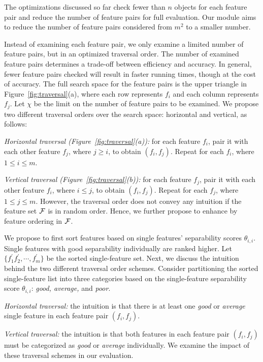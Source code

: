 The optimizations discussed so far check fewer
than $n$ objects for each feature pair and reduce
the number of feature pairs
for full evaluation. Our \traversal module
aims to reduce the number of feature pairs
considered from $m^2$ to a smaller number.

 Instead of examining each feature pair, we only examine a limited number of feature pairs, but in an optimized traversal order. The number of examined feature pairs determines a trade-off between efficiency and accuracy. In general, fewer feature pairs checked will result in faster running times, though at the cost of accuracy.
The full search space for the feature pairs is the upper triangle in Figure~\ref{fig:traversal}(a), where each row represents $f_i$ and each column represents $f_j$. Let $\chi$ be the limit on the number of feature pairs to be examined. We propose two different traversal orders over the search space: horizontal and vertical, as follows:
\squishlist
\item \emph{Horizontal traversal (Figure~\ref{fig:traversal}(a)):} for each feature $f_i$, pair it with each other feature $f_j$, where $j\geq i$, to obtain $(f_i,f_j)$. Repeat for each $f_i$, where $1 \leq i\leq m$.
\item \emph{Vertical traversal (Figure~\ref{fig:traversal}(b)):} for each feature $f_j$, pair it with each other feature $f_i$, where $i\leq j$, to obtain $(f_i,f_j)$. Repeat for each $f_j$, where $1 \leq j\leq m$.
\squishend
\noindent
However, the traversal order does not convey any intuition if the feature set ${\mathcal{F}}$ is in random order. Hence, we further propose to enhance \traversal by feature ordering in ${\mathcal{F}}$.

 We propose to first sort features based on single features' separability scores $\theta_{i,i}$. Single features with good separability individually are ranked higher. Let $\{f_1^{'} f_2^{'},\cdots,f_m^{'}\}$ be the sorted single-feature set. Next, we discuss the intuition behind the two different traversal order schemes. Consider partitioning the sorted single-feature list into three categories based on the single-feature separability score $\theta_{i,i}$: {\em good, average,} and {\em poor}.
\squishlist
\item \emph{Horizontal traversal:} the intuition is that there is at least one {\em good} or {\em average} single feature in each \topk feature pair $(f_i,f_j)$.
\item \emph{Vertical traversal:} the intuition is that both features in each \topk feature pair $(f_i,f_j)$ must be categorized as {\em good} or {\em average} individually.
\squishend
\noindent We examine the impact of these traversal schemes in our evaluation.

